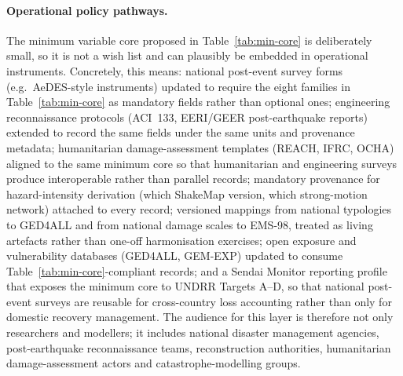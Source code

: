 \documentclass[11pt,a4paper]{article}
\begin{document}
\paragraph{Operational policy pathways.} The minimum variable core proposed in Table~\ref{tab:min-core} is deliberately small, so it is not a wish list and can plausibly be embedded in operational instruments. Concretely, this means: national post-event survey forms (e.g.\ AeDES-style instruments) updated to require the eight families in Table~\ref{tab:min-core} as mandatory fields rather than optional ones; engineering reconnaissance protocols (ACI~133, EERI/GEER post-earthquake reports) extended to record the same fields under the same units and provenance metadata; humanitarian damage-assessment templates (REACH, IFRC, OCHA) aligned to the same minimum core so that humanitarian and engineering surveys produce interoperable rather than parallel records; mandatory provenance for hazard-intensity derivation (which ShakeMap version, which strong-motion network) attached to every record; versioned mappings from national typologies to GED4ALL and from national damage scales to EMS-98, treated as living artefacts rather than one-off harmonisation exercises; open exposure and vulnerability databases (GED4ALL, GEM-EXP) updated to consume Table~\ref{tab:min-core}-compliant records; and a Sendai Monitor reporting profile that exposes the minimum core to UNDRR Targets A--D, so that national post-event surveys are reusable for cross-country loss accounting rather than only for domestic recovery management. The audience for this layer is therefore not only researchers and modellers; it includes national disaster management agencies, post-earthquake reconnaissance teams, reconstruction authorities, humanitarian damage-assessment actors and catastrophe-modelling groups.
\end{document}
